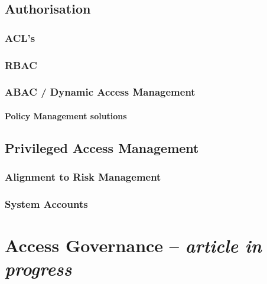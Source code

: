 \hypertarget{authorisation}{%
\subsection{Authorisation}\label{authorisation}}

\hypertarget{acls}{%
\subsubsection{ACL's}\label{acls}}

\hypertarget{rbac}{%
\subsubsection{RBAC}\label{rbac}}

\hypertarget{abac-dynamic-access-management}{%
\subsubsection{ABAC / Dynamic Access
Management}\label{abac-dynamic-access-management}}

\hypertarget{policy-management-solutions}{%
\paragraph{Policy Management
solutions}\label{policy-management-solutions}}

\hypertarget{privileged-access-management}{%
\subsection{Privileged Access
Management}\label{privileged-access-management}}

\hypertarget{alignment-to-risk-management}{%
\subsubsection{Alignment to Risk
Management}\label{alignment-to-risk-management}}

\hypertarget{system-accounts}{%
\subsubsection{System Accounts}\label{system-accounts}}

\hypertarget{access-governance-article-in-progress}{%
\section{\texorpdfstring{Access Governance -- \emph{article in
progress}}{Access Governance -- article in progress}}\label{access-governance-article-in-progress}}

